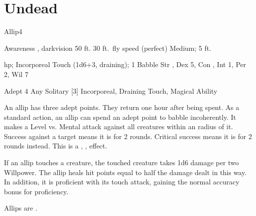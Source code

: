 \section{Undead}

    \begin{monsection}{Allip}{4}
        \begin{spellcontent}
            \begin{spelltargetinginfo}
                \pari {} Awareness , darkvision 50 ft.
                \pari {} 30 ft.\ fly speed (perfect)
                \pari {} Medium;  5 ft.
            \end{spelltargetinginfo}
            \begin{spelleffects}
                \pari {} hp; 
                \pari {} Incorporeal
                \pari {} Touch  (1d6+3, draining);  1
                \pari {} Babble 
                \pari {} Str \tdash, Dex 5, Con \tdash, Int 1, Per 2, Wil 7
            \end{spelleffects}
        \end{spellcontent}
        \begin{spellfooter}
            \pari {} Adept 4
            \pari {} Any
            \pari {} Solitary
            \pari {} [3] Incorporeal, Draining Touch, Magical Ability
        \end{spellfooter}
    \end{monsection}
     An allip has three adept points.
    They return one hour after being spent.
     As a standard action, an allip can spend an adept point to babble incoherently.
    It makes a Level vs. Mental attack against all creatures within an \areamed radius of it.
    Success against a target means it is \disoriented for 2 rounds.
    Critical success means it is \confused for 2 rounds instead.
    This is a , ,  effect. 

     If an allip touches a creature, the touched creature takes 1d6 damage  per two Willpower.
    The allip heals hit points equal to half the damage dealt in this way.
    In addition, it is proficient with its touch attack, gaining the normal  accuracy bonus for proficiency.

     Allips are .
